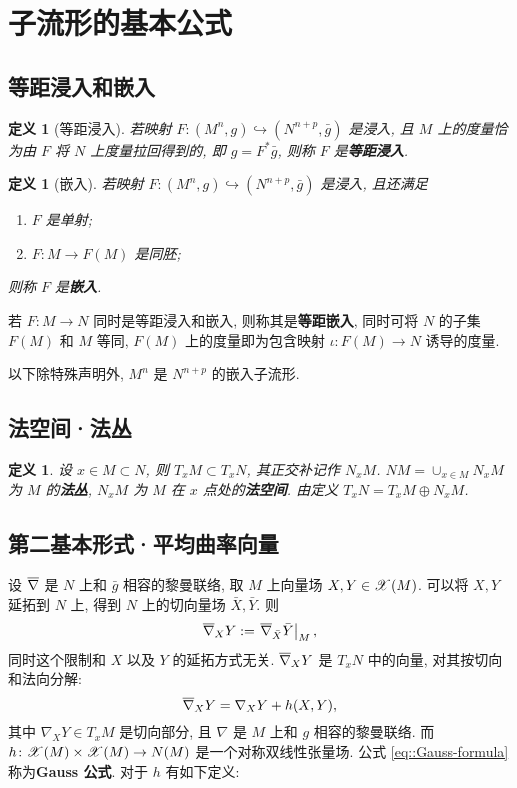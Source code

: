 \documentclass{ctexart}
\newtheorem{definition}[theorem]{定义}
\begin{document}
\section{子流形的基本公式}
\subsection{等距浸入和嵌入}
\begin{definition}[等距浸入]
	若映射 $F\colon (M^n, g) \hookrightarrow (N^{n + p}, \bar{g})$ 是浸入, 且 $M$ 上的度量恰为由 $F$ 将 $N$ 上度量拉回得到的, 即 $g = F^{\ast}\bar{g}$, 则称 $F$ 是{\bf 等距浸入}.
\end{definition}

\begin{definition}[嵌入]
	若映射 $F\colon (M^n, g) \hookrightarrow (N^{n + p}, \bar{g})$ 是浸入, 且还满足
	\begin{enumerate}
		\item $F$ 是单射;
		\item $F\colon M \rightarrow F(M)$ 是同胚;
	\end{enumerate}
	则称 $F$ 是{\bf 嵌入}.
\end{definition}

若 $F \colon M \rightarrow N$ 同时是等距浸入和嵌入, 则称其是{\bf 等距嵌入}, 同时可将 $N$ 的子集 $F(M)$ 和 $M$ 等同, $F(M)$ 上的度量即为包含映射 $\iota \colon F(M) \rightarrow N$ 诱导的度量.

以下除特殊声明外, $M^n$ 是 $N^{n + p}$ 的嵌入子流形.

\subsection{法空间·法丛}
\begin{definition}
	设 $x \in M \subset N$, 则 $T_xM \subset T_xN$, 其正交补记作 $N_xM$. $NM = \cup_{x \in M}N_xM$ 为 $M$ 的{\bf 法丛}, $N_xM$ 为 $M$ 在 $x$ 点处的{\bf 法空间}. 由定义 $T_xN = T_x{M} \oplus N_xM$.
\end{definition}

\subsection{第二基本形式·平均曲率向量}
设 $\overline{\nabla}$ 是 $N$ 上和 $\bar{g}$ 相容的黎曼联络, 取 $M$ 上向量场 $X, Y \in \mathscr{X}(M)$. 可以将 $X, Y$ 延拓到 $N$ 上, 得到 $N$ 上的切向量场 $\bar{X}, \bar{Y}$. 则
\begin{equation}\label{eq::restriction-of-bar-nabla}
	\overline{\nabla}_{X}Y := \left.\overline{\nabla}_{\bar{X}}\bar{Y}\right|_{M},
\end{equation}
同时这个限制和 $X$ 以及 $Y$ 的延拓方式无关. $\overline{\nabla}_{X}Y$ 是 $T_xN$ 中的向量, 对其按切向和法向分解:
\begin{equation}\label{eq::Gauss-formula}
	\overline{\nabla}_{X}Y = \nabla_XY + h(X, Y),
\end{equation}
其中 $\nabla_XY \in T_xM$ 是切向部分, 且 $\nabla$ 是 $M$ 上和 $g$ 相容的黎曼联络. 而 $h \colon \mathscr{X}(M) \times \mathscr{X}(M) \rightarrow N(M)$ 是一个对称双线性张量场. 公式 \ref{eq::Gauss-formula} 称为{\bf Gauss 公式}. 对于 $h$ 有如下定义:
\end{document}
